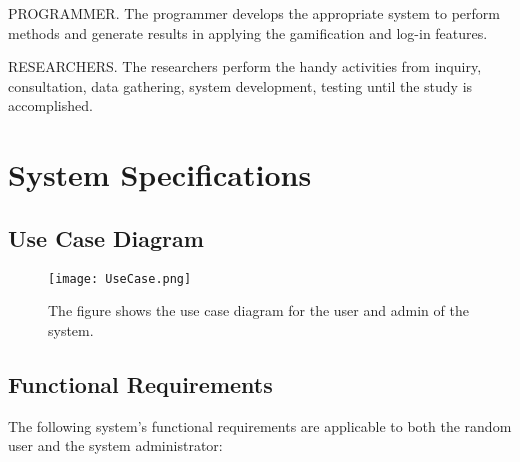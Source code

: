 PROGRAMMER. The programmer develops the appropriate system to perform
methods and generate results in applying the gamification and log-in features.

RESEARCHERS. The researchers perform the handy activities from inquiry,
consultation, data gathering, system development, testing until the study is accomplished.

\section{System Specifications}

\subsection{Use Case Diagram}

\begin{figure}[h]
	\centering
	\texttt{[image: UseCase.png]}
	\caption{The figure shows the use case diagram for the user and admin of the system.}
	\label{fig:usecase}
\end{figure}

\subsection{Functional Requirements}

The following system's functional requirements are applicable to both the random user and the system administrator:


